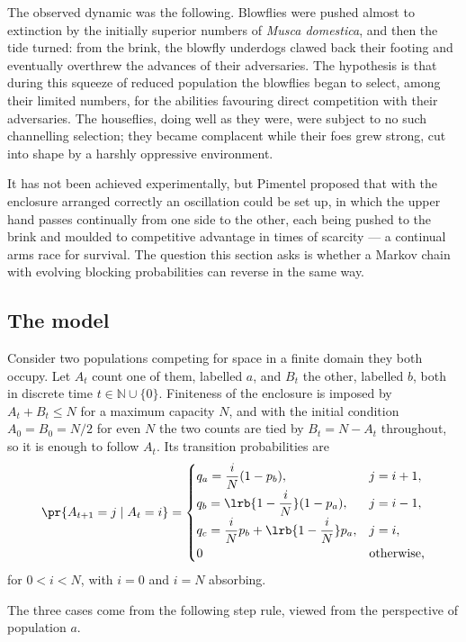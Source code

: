 The observed dynamic was the following. Blowflies were pushed almost to
extinction by the initially superior numbers of \textit{Musca domestica}, and
then the tide turned: from the brink, the blowfly underdogs clawed back their
footing and eventually overthrew the advances of their adversaries. The
hypothesis is that during this squeeze of reduced population the blowflies
began to select, among their limited numbers, for the abilities favouring
direct competition with their adversaries. The houseflies, doing well as they
were, were subject to no such channelling selection; they became complacent
while their foes grew strong, cut into shape by a harshly oppressive
environment.

It has not been achieved experimentally, but Pimentel proposed that with the
enclosure arranged correctly an oscillation could be set up, in which the
upper hand passes continually from one side to the other, each being pushed
to the brink and moulded to competitive advantage in times of scarcity --- a
continual arms race for survival. The question this section asks is whether a
Markov chain with evolving blocking probabilities can reverse in the same way.

\subsection{The model}
\label{var:sec:pimentelmodel}

Consider two populations competing for space in a finite domain they both
occupy. Let $A_t$ count one of them, labelled $a$, and $B_t$ the other,
labelled $b$, both in discrete time $t\in\mathbb{N}\cup\{0\}$. Finiteness of
the enclosure is imposed by $A_t+B_t\le N$ for a maximum capacity $N$, and
with the initial condition $A_0=B_0=N/2$ for even $N$ the two counts are tied
by $B_t=N-A_t$ throughout, so it is enough to follow $A_t$. Its transition
probabilities are
\begin{equation}
\pr{A_{t+1}=j\mid A_t=i}=
\begin{cases}
q_a=\dfrac{i}{N}(1-p_b), & j=i+1,\\[4pt]
q_b=\lrb{1-\dfrac{i}{N}}(1-p_a), & j=i-1,\\[4pt]
q_c=\dfrac{i}{N}p_b+\lrb{1-\dfrac{i}{N}}p_a, & j=i,\\[4pt]
0 & \text{otherwise,}
\end{cases}
\label{var:eq:kernel}
\end{equation}
for $0<i<N$, with $i=0$ and $i=N$ absorbing.

The three cases come from the following step rule, viewed from the
perspective of population $a$.

